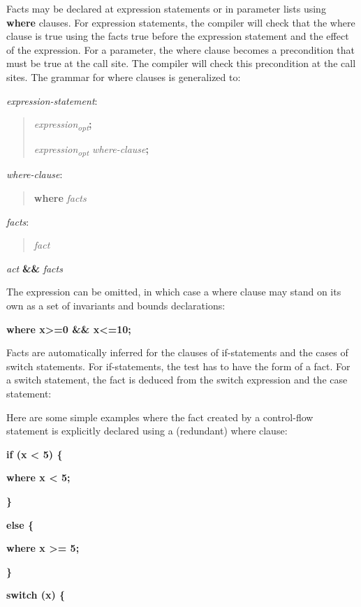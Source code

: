 \documentclass[]{article}
\begin{document}
Facts may be declared at expression statements or in parameter lists
using \textbf{where} clauses. For expression statements, the compiler
will check that the where clause is true using the facts true before the
expression statement and the effect of the expression. For a parameter,
the where clause becomes a precondition that must be true at the call
site. The compiler will check this precondition at the call sites. The
grammar for where clauses is generalized to:

\emph{expression-statement}:

\begin{quote}
\emph{expression\textsubscript{opt}}\textbf{;}

\emph{expression\textsubscript{opt} where-clause}\textbf{;}
\end{quote}

\emph{where-clause}:

\begin{quote}
\textbf{where} \emph{facts}
\end{quote}

\emph{facts}:

\begin{quote}
\emph{fact}
\end{quote}

\emph{act} \textbf{\&\&} \emph{facts}

The expression can be omitted, in which case a where clause may stand on
its own as a set of invariants and bounds declarations:

\textbf{where x\textgreater{}=0 \&\& x\textless{}=10;}

Facts are automatically inferred for the clauses of if-statements and
the cases of switch statements. For if-statements, the test has to have
the form of a fact. For a switch statement, the fact is deduced from the
switch expression and the case statement:

Here are some simple examples where the fact created by a control-flow
statement is explicitly declared using a (redundant) where clause:

\textbf{if (x \textless{} 5) \{}

\textbf{where x \textless{} 5;}

\textbf{\}}

\textbf{else \{}

\textbf{where x \textgreater{}= 5;}

\textbf{\} }

\textbf{switch (x) \{}
\end{document}
